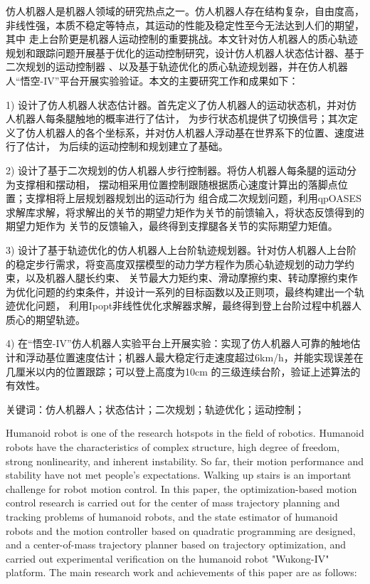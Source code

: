\cleardoublepage
{}

仿人机器人是机器人领域的研究热点之一。仿人机器人存在结构复杂，自由度高，非线性强，本质不稳定等特点，其运动的性能及稳定性至今无法达到人们的期望，其中
走上台阶更是机器人运动控制的重要挑战。本文针对仿人机器人的质心轨迹规划和跟踪问题开展基于优化的运动控制研究，设计仿人机器人状态估计器、基于二次规划的运动控制器
、以及基于轨迹优化的质心轨迹规划器，并在仿人机器人“悟空-IV”平台开展实验验证。本文的主要研究工作和成果如下：

1) 设计了仿人机器人状态估计器。首先定义了仿人机器人的运动状态机，并对仿人机器人每条腿触地的概率进行了估计，
为步行状态机提供了切换信号；其次定义了仿人机器人的各个坐标系，并对仿人机器人浮动基在世界系下的位置、速度进行了估计，
为后续的运动控制和规划建立了基础。

2) 设计了基于二次规划的仿人机器人步行控制器。将仿人机器人每条腿的运动分为支撑相和摆动相，
摆动相采用位置控制跟随根据质心速度计算出的落脚点位置；支撑相将上层规划器规划出的运动行为
组合成二次规划问题，利用qpOASES求解库求解，将求解出的关节的期望力矩作为关节的前馈输入，将状态反馈得到的期望力矩作为
关节的反馈输入，最终得到支撑腿各关节的实际期望力矩值。

3) 设计了基于轨迹优化的仿人机器人上台阶轨迹规划器。针对仿人机器人上台阶的稳定步行需求，将变高度双摆模型的动力学方程作为质心轨迹规划的动力学约束，以及机器人腿长约束、
关节最大力矩约束、滑动摩擦约束、转动摩擦约束作为优化问题的约束条件，并设计一系列的目标函数以及正则项，最终构建出一个轨迹优化问题，
利用Ipopt非线性优化求解器求解，最终得到登上台阶过程中机器人质心的期望轨迹。

4) 在“悟空-IV”仿人机器人实验平台上开展实验：实现了仿人机器人可靠的触地估计和浮动基位置速度估计；机器人最大稳定行走速度超过6km/h，并能实现误差在几厘米以内的位置跟踪；可以登上高度为10cm
的三级连续台阶，验证上述算法的有效性。

$\textbf{关键词}$：仿人机器人；状态估计；二次规划；轨迹优化；运动控制；

\cleardoublepage
{}

Humanoid robot is one of the research hotspots in the field of robotics. Humanoid robots have the characteristics of complex structure, high degree of freedom, 
strong nonlinearity, and inherent instability. So far, their motion performance and stability have not met people's expectations. 
Walking up stairs is an important challenge for robot motion control. In this paper, the optimization-based motion control research is carried out 
for the center of mass trajectory planning and tracking problems of humanoid robots, and the state estimator of humanoid robots and the motion controller 
based on quadratic programming are designed, and a center-of-mass trajectory planner based on trajectory optimization, and carried out experimental verification 
on the humanoid robot "Wukong-IV" platform. The main research work and achievements of this paper are as follows:

